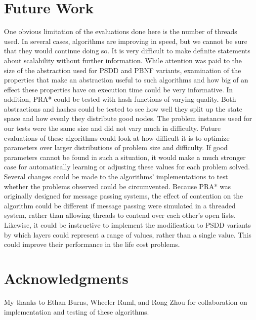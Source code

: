 \documentclass{article}
\begin{document}
\section{Future Work}
One obvious limitation of the evaluations done here is the number of threads used. In several cases, algorithms are improving in speed, but we cannot be sure that they would continue doing so. It is very difficult to make definite statements about scalability without further information.
While attention was paid to the size of the abstraction used for PSDD and PBNF variants, examination of the properties that make an abstraction useful to such algorithms and how big of an effect these properties have on execution time could be very informative. In addition, PRA* could be tested with hash functions of varying quality. Both abstractions and hashes could be tested to see how well they split up the state space and how evenly they distribute good nodes.
The problem instances used for our tests were the same size and did not vary much in difficulty. Future evaluations of these algorithms could look at how difficult it is to optimize parameters over larger distributions of problem size and difficulty. If good parameters cannot be found in such a situation, it would make a much stronger case for automatically learning or adjusting these values for each problem solved.
Several changes could be made to the algorithms' implementations to test whether the problems observed could be circumvented. Because PRA* was originally designed for message passing systems, the effect of contention on the algorithm could be different if message passing were simulated in a threaded system, rather than allowing threads to contend over each other's open lists. Likewise, it could be instructive to implement the modification to PSDD variants by which layers could represent a range of values, rather than a single value. This could improve their performance in the life cost problems.
\section{Acknowledgments}
My thanks to Ethan Burns, Wheeler Ruml, and Rong Zhou for collaboration on implementation and testing of these algorithms.



\end{document}
